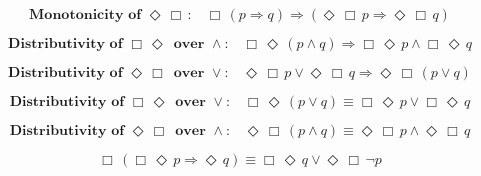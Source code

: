 \documentclass[12pt, fleqn, leqno]{article}
\newcommand{\impl}{\ensuremath{\Rightarrow}}        %
\newcommand{\Event}{\Diamond\,}
\newcommand{\Always}{\Box\,}
\newcommand{\spacer}{\vspace{-30pt}}
\begin{document}
\spacer

\begin{equation}\label{E:monoEventAlways}
\textbf{Monotonicity of $\Event\Always$:}\quad \Always (p \impl q) \impl (\Event\Always p \impl \Event\Always q)
\end{equation}

\spacer

\begin{equation}\label{E:distAlwaysEventAnd}
\textbf{Distributivity of $\Always\Event$ over $\land$:}\quad \Always\Event(p \land q) \impl \Always\Event p \land \Always\Event q
\end{equation}

\spacer

\begin{equation}\label{E:distEventAlwaysOr}
\textbf{Distributivity of $\Event\Always$ over $\lor$:}\quad \Event\Always p \lor \Event\Always q \impl \Event\Always (p \lor q)
\end{equation}

\spacer

\begin{equation}\label{E:distAlwaysEventOr}
\textbf{Distributivity of $\Always\Event$ over $\lor$:}\quad \Always\Event(p \lor q) \equiv \Always\Event p \lor \Always\Event q
\end{equation}

\spacer

\begin{equation}\label{E:distEventAlwaysAnd}
\textbf{Distributivity of $\Event\Always$ over $\land$:}\quad \Event\Always(p \land q) \equiv \Event\Always p \land \Event\Always q
\end{equation}

\spacer

\begin{equation}\label{E:BenAriequiv1}
\Always (\Always\Event p \impl \Event q) \equiv \Always\Event q \lor \Event\Always\neg p
\end{equation}

\spacer
\end{document}
